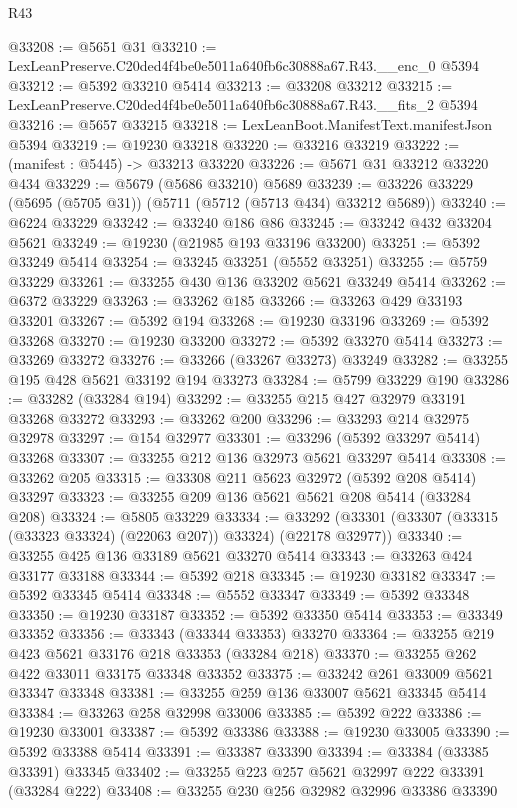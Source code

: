 \begin{lexlean}{R43}
\begin{coremodule}
@33208 := @5651 @31
@33210 := LexLeanPreserve.C20ded4f4be0e5011a640fb6c30888a67.R43.__enc_0 @5394
@33212 := @5392 @33210 @5414
@33213 := @33208 @33212
@33215 := LexLeanPreserve.C20ded4f4be0e5011a640fb6c30888a67.R43.__fits_2 @5394
@33216 := @5657 @33215
@33218 := LexLeanBoot.ManifestText.manifestJson @5394
@33219 := @19230 @33218
@33220 := @33216 @33219
@33222 := (manifest : @5445) -> @33213 @33220
@33226 := @5671 @31 @33212 @33220 @434
@33229 := @5679 (@5686 @33210) @5689
@33239 := @33226 @33229 (@5695 (@5705 @31)) (@5711 (@5712 (@5713 @434) @33212 @5689))
@33240 := @6224 @33229
@33242 := @33240 @186 @86
@33245 := @33242 @432 @33204 @5621
@33249 := @19230 (@21985 @193 @33196 @33200)
@33251 := @5392 @33249 @5414
@33254 := @33245 @33251 (@5552 @33251)
@33255 := @5759 @33229
@33261 := @33255 @430 @136 @33202 @5621 @33249 @5414
@33262 := @6372 @33229
@33263 := @33262 @185
@33266 := @33263 @429 @33193 @33201
@33267 := @5392 @194
@33268 := @19230 @33196
@33269 := @5392 @33268
@33270 := @19230 @33200
@33272 := @5392 @33270 @5414
@33273 := @33269 @33272
@33276 := @33266 (@33267 @33273) @33249
@33282 := @33255 @195 @428 @5621 @33192 @194 @33273
@33284 := @5799 @33229 @190
@33286 := @33282 (@33284 @194)
@33292 := @33255 @215 @427 @32979 @33191 @33268 @33272
@33293 := @33262 @200
@33296 := @33293 @214 @32975 @32978
@33297 := @154 @32977
@33301 := @33296 (@5392 @33297 @5414) @33268
@33307 := @33255 @212 @136 @32973 @5621 @33297 @5414
@33308 := @33262 @205
@33315 := @33308 @211 @5623 @32972 (@5392 @208 @5414) @33297
@33323 := @33255 @209 @136 @5621 @5621 @208 @5414 (@33284 @208)
@33324 := @5805 @33229
@33334 := @33292 (@33301 (@33307 (@33315 (@33323 @33324) (@22063 @207)) @33324) (@22178 @32977))
@33340 := @33255 @425 @136 @33189 @5621 @33270 @5414
@33343 := @33263 @424 @33177 @33188
@33344 := @5392 @218
@33345 := @19230 @33182
@33347 := @5392 @33345 @5414
@33348 := @5552 @33347
@33349 := @5392 @33348
@33350 := @19230 @33187
@33352 := @5392 @33350 @5414
@33353 := @33349 @33352
@33356 := @33343 (@33344 @33353) @33270
@33364 := @33255 @219 @423 @5621 @33176 @218 @33353 (@33284 @218)
@33370 := @33255 @262 @422 @33011 @33175 @33348 @33352
@33375 := @33242 @261 @33009 @5621 @33347 @33348
@33381 := @33255 @259 @136 @33007 @5621 @33345 @5414
@33384 := @33263 @258 @32998 @33006
@33385 := @5392 @222
@33386 := @19230 @33001
@33387 := @5392 @33386
@33388 := @19230 @33005
@33390 := @5392 @33388 @5414
@33391 := @33387 @33390
@33394 := @33384 (@33385 @33391) @33345
@33402 := @33255 @223 @257 @5621 @32997 @222 @33391 (@33284 @222)
@33408 := @33255 @230 @256 @32982 @32996 @33386 @33390

\end{coremodule}
\end{lexlean}
